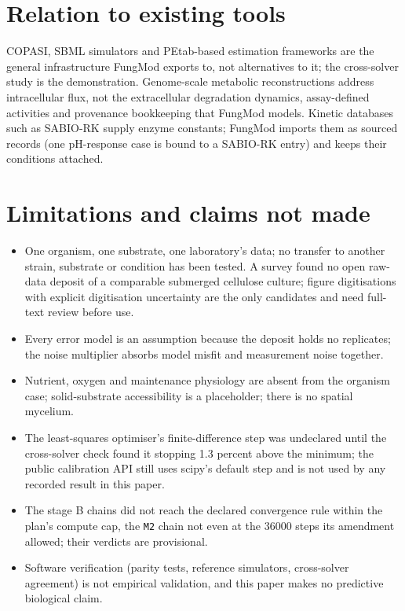 \documentclass[11pt,a4paper]{article}
\begin{document}
\section{Relation to existing tools}

COPASI, SBML simulators and PEtab-based estimation frameworks are the
general infrastructure FungMod exports to, not alternatives to it; the
cross-solver study is the demonstration. Genome-scale metabolic
reconstructions address intracellular flux, not the extracellular
degradation dynamics, assay-defined activities and provenance bookkeeping
that FungMod models. Kinetic databases such as SABIO-RK \citep{wittig2012}
supply enzyme constants; FungMod imports them as sourced records (one
pH-response case is bound to a SABIO-RK entry) and keeps their conditions
attached.

\section{Limitations and claims not made}

\begin{itemize}
\item One organism, one substrate, one laboratory's data; no transfer to
  another strain, substrate or condition has been tested. A survey found no
  open raw-data deposit of a comparable submerged cellulose culture; figure
  digitisations with explicit digitisation uncertainty are the only
  candidates and need full-text review before use.
\item Every error model is an assumption because the deposit holds no
  replicates; the noise multiplier absorbs model misfit and measurement
  noise together.
\item Nutrient, oxygen and maintenance physiology are absent from the
  organism case; solid-substrate accessibility is a placeholder; there is no
  spatial mycelium.
\item The least-squares optimiser's finite-difference step was undeclared
  until the cross-solver check found it stopping 1.3 percent above the
  minimum; the public calibration API still uses scipy's default step and
  is not used by any recorded result in this paper.
\item The stage B chains did not reach the declared convergence rule within
  the plan's compute cap, the \texttt{M2} chain not even at the 36000 steps
  its amendment allowed; their verdicts are provisional.
\item Software verification (parity tests, reference simulators,
  cross-solver agreement) is not empirical validation, and this paper makes
  no predictive biological claim.
\end{itemize}
\end{document}
